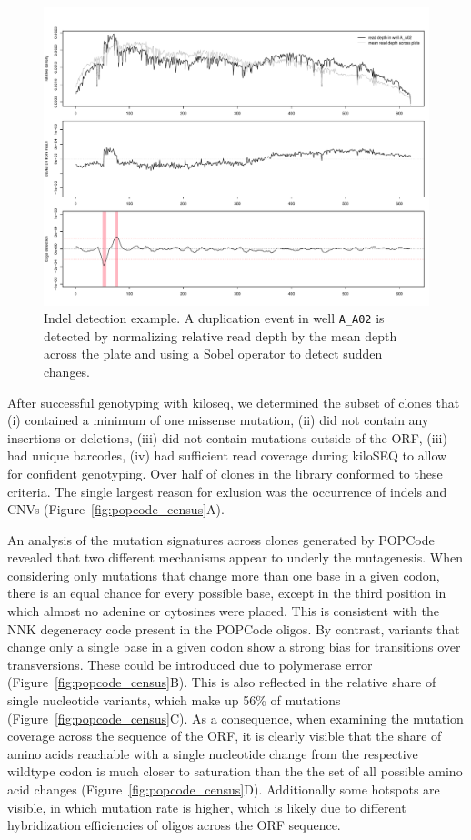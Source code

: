 \begin{figure}[h!]
	\centering
	\includegraphics[width=\textwidth]{img/border_detect.pdf}
	\caption{Indel detection example. A duplication event in well \texttt{A\_A02} is detected by normalizing relative read depth by the mean depth across the plate and using a Sobel operator to detect sudden changes.}
	\label{fig:border_detect}
\end{figure}


After successful genotyping with kiloseq, we determined the subset of clones that (i) contained a minimum of one missense mutation, (ii) did not contain any insertions or deletions, (iii) did not contain mutations outside of the ORF, (iii) had unique barcodes, (iv) had sufficient read coverage during kiloSEQ to allow for confident genotyping.
Over half of clones in the library conformed to these criteria. The single largest reason for exlusion was the occurrence of indels and CNVs (Figure~\ref{fig:popcode_census}A). 

An analysis of the mutation signatures across clones generated by POPCode revealed that two different mechanisms appear to underly the mutagenesis. When considering only mutations that change more than one base in a given codon, there is an equal chance for every possible base, except in the third position in which almost no adenine or cytosines were placed. This is consistent with the NNK degeneracy code present in the POPCode oligos. By contrast, variants that change only a single base in a given codon show a strong bias for transitions over transversions. These could be introduced due to polymerase error (Figure~\ref{fig:popcode_census}B). This is also reflected in the relative share of single nucleotide variants, which make up 56\% of mutations (Figure~\ref{fig:popcode_census}C). As a consequence, when examining the mutation coverage across the sequence of the ORF, it is clearly visible that the share of amino acids reachable with a single nucleotide change from the respective wildtype codon is much closer to saturation than the the set of all possible amino acid changes (Figure~\ref{fig:popcode_census}D). Additionally some hotspots are visible, in which mutation rate is higher, which is likely due to different hybridization efficiencies of oligos across the ORF sequence.

